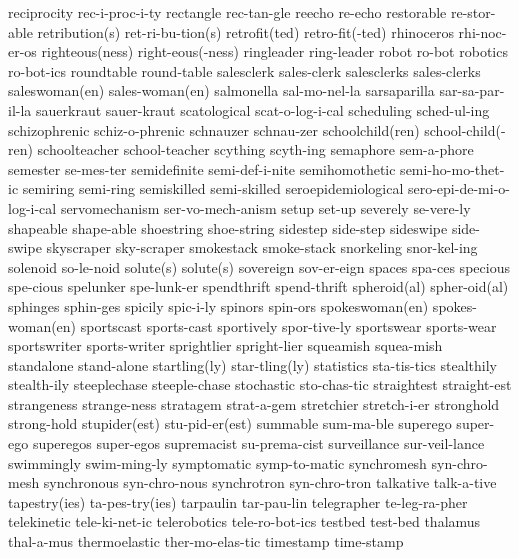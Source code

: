 \1 reciprocity		rec-i-proc-i-ty
\1 rectangle		rec-tan-gle
\1 reecho		re-echo
\1 restorable		re-stor-able
\1 retribution(s)	ret-ri-bu-tion(s)
\1 retrofit(ted)	retro-fit(-ted)
\1 rhinoceros		rhi-noc-er-os
\1 righteous(ness)	right-eous(-ness)
\1 ringleader		ring-leader
\1 robot		ro-bot
\1 robotics		ro-bot-ics
\1 roundtable		round-table
\1 salesclerk		sales-clerk
\1 salesclerks		sales-clerks
\1 saleswoman(en)	sales-woman(en)
\1 salmonella		sal-mo-nel-la
\1 sarsaparilla		sar-sa-par-il-la
\1 sauerkraut		sauer-kraut
\1 scatological		scat-o-log-i-cal
\1 scheduling		sched-ul-ing
\1 schizophrenic	schiz-o-phrenic
\1 schnauzer		schnau-zer
\1 schoolchild(ren)	school-child(-ren)
\1 schoolteacher	school-teacher
\1 scything		scyth-ing
\1 semaphore		sem-a-phore
\1 semester		se-mes-ter
\1 semidefinite 	semi-def-i-nite
\1 semihomothetic	semi-ho-mo-thet-ic
\1 semiring		semi-ring
\1 semiskilled		semi-skilled
\1 seroepidemiological	sero-epi-de-mi-o-log-i-cal
\1 servomechanism	ser-vo-mech-anism
\1 setup		set-up	
\1 severely		se-vere-ly
\1 shapeable		shape-able
\1 shoestring		shoe-string
\1 sidestep		side-step
\1 sideswipe		side-swipe
\1 skyscraper		sky-scraper
\1 smokestack		smoke-stack
\1 snorkeling		snor-kel-ing
\1 solenoid		so-le-noid
\1 solute(s)		solute(s)
\1 sovereign		sov-er-eign
\1 spaces		spa-ces
\1 specious		spe-cious
\1 spelunker		spe-lunk-er
\1 spendthrift		spend-thrift
\1 spheroid(al)		spher-oid(al)
\1 sphinges		sphin-ges
\1 spicily		spic-i-ly
\1 spinors		spin-ors
\1 spokeswoman(en)	spokes-woman(en)
\1 sportscast		sports-cast
\1 sportively		spor-tive-ly
\1 sportswear		sports-wear
\1 sportswriter		sports-writer
\1 sprightlier		spright-lier
\1 squeamish		squea-mish
\1 standalone		stand-alone
\1 startling(ly)	star-tling(ly)
\1 statistics		sta-tis-tics
\1 stealthily		stealth-ily
\1 steeplechase		steeple-chase
\1 stochastic		sto-chas-tic
\1 straightest		straight-est
\1 strangeness		strange-ness
\1 stratagem		strat-a-gem
\1 stretchier		stretch-i-er
\1 stronghold		strong-hold
\1 stupider(est)	stu-pid-er(est)
\1 summable		sum-ma-ble
\1 superego		super-ego
\1 superegos		super-egos
\1 supremacist		su-prema-cist
\1 surveillance		sur-veil-lance
\1 swimmingly		swim-ming-ly
\1 symptomatic		symp-to-matic
\1 synchromesh		syn-chro-mesh
\1 synchronous		syn-chro-nous
\1 synchrotron		syn-chro-tron
\1 talkative		talk-a-tive
\1 tapestry(ies)	ta-pes-try(ies)
\1 tarpaulin		tar-pau-lin
\1 telegrapher		te-leg-ra-pher
\1 telekinetic		tele-ki-net-ic
\1 telerobotics		tele-ro-bot-ics
\1 testbed		test-bed
\1 thalamus		thal-a-mus
\1 thermoelastic	ther-mo-elas-tic
\1 timestamp		time-stamp
